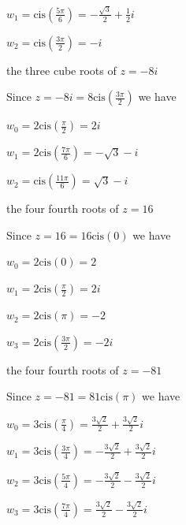 \documentclass{ximera}
\begin{document}
\begin{question}
\begin{problem}
\begin{solution}
$w_{1} = \text{cis}\left(\frac{5\pi}{6}\right) = -\frac{\sqrt{3}}{2} + \frac{1}{2}i$

$w_{2} = \text{cis}\left(\frac{3\pi}{2}\right) = -i$
\end{solution}
\end{problem}

\begin{problem}
the three cube roots of $z = -8i$

\begin{solution}
 Since $z = -8i = 8\text{cis}\left(\frac{3\pi}{2}\right)$ we have 

$w_{0} = 2\text{cis}\left(\frac{\pi}{2}\right) = 2i$

$w_{1} = 2\text{cis}\left(\frac{7\pi}{6}\right) = -\sqrt{3} -i$

$w_{2} = \text{cis}\left(\frac{11\pi}{6}\right) = \sqrt{3}-i$

\end{solution}
\end{problem}

\begin{problem}
the four fourth roots of $z=16$

\begin{solution}
Since $z=16 = 16\text{cis}\left(0 \right)$ we have 

$w_{0} =2\text{cis}\left(0\right) =2$

$w_{1} = 2\text{cis}\left(\frac{\pi}{2}\right) = 2i$

$w_{2} = 2\text{cis}\left(\pi\right) = -2$

$w_{3} = 2\text{cis}\left(\frac{3\pi}{2}\right) = -2i$

\end{solution}
\end{problem}

\begin{problem}
the four fourth roots of $z=-81$

\begin{solution}
Since $z=-81 = 81\text{cis}\left(\pi \right)$ we have 

$w_{0} =3\text{cis}\left(\frac{\pi}{4}\right) = \frac{3\sqrt{2}}{2} + \frac{3\sqrt{2}}{2}i$

$w_{1} = 3\text{cis}\left(\frac{3\pi}{4}\right) =-\frac{3\sqrt{2}}{2} + \frac{3\sqrt{2}}{2}i$

$w_{2} = 3\text{cis}\left(\frac{5\pi}{4}\right) =-\frac{3\sqrt{2}}{2} - \frac{3\sqrt{2}}{2}i$

$w_{3} = 3\text{cis}\left(\frac{7\pi}{4}\right) =\frac{3\sqrt{2}}{2} - \frac{3\sqrt{2}}{2}i$


\end{solution}
\end{problem}
\end{question}
\end{document}
